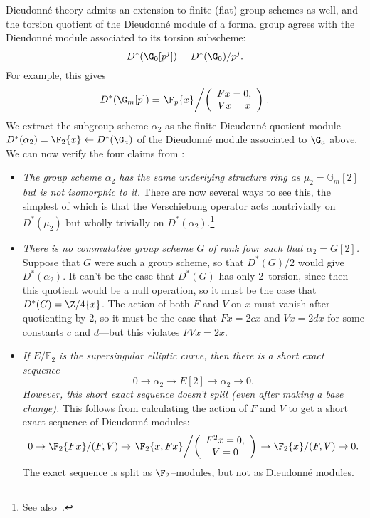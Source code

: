\begin{example}\label{WorkedAlpha2Example}
Dieudonn\'e theory admits an extension to finite (flat) group schemes as well, and the torsion quotient of the Dieudonn\'e module of a formal group agrees with the Dieudonn\'e module associated to its torsion subscheme: \[D^*(\G_0[p^j]) = D^*(\G_0) / p^j.\]  For example, this gives \[D^*(\G_m[p]) = \left.\F_p\{x\} \middle/\left(\begin{array}{c} Fx = 0, \\ Vx = x \end{array}\right)\right. .\]  We extract the subgroup scheme $\alpha_2$ as the finite Dieudonn\'e quotient module $D^*(\alpha_2) = \F_2\{x\} \leftarrow D^*(\G_a)$ of the Dieudonn\'e module associated to $\G_a$ above.  We can now verify the four claims from :
\begin{itemize}
\item \textit{The group scheme $\alpha_2$ has the same underlying structure ring as $\mu_2 = \mathbb{G}_m[2]$ but is not isomorphic to it.}  There are now several ways to see this, the simplest of which is that the Verschiebung operator acts nontrivially on $D^*(\mu_2)$ but wholly trivially on $D^*(\alpha_2)$.\footnote{See also~\cite[Example 8.5]{StricklandFPFP}.}
\item \textit{There is no commutative group scheme $G$ of rank four such that $\alpha_2 = G[2]$.}  Suppose that $G$ were such a group scheme, so that $D^*(G) / 2$ would give $D^*(\alpha_2)$.  It can't be the case that $D^*(G)$ has only $2$--torsion, since then this quotient would be a null operation, so it must be the case that $D^*(G) = \Z/4\{x\}$.  The action of both $F$ and $V$ on $x$ must vanish after quotienting by $2$, so it must be the case that $Fx = 2cx$ and $Vx = 2dx$ for some constants $c$ and $d$---but this violates $FVx = 2x$.
\item \textit{If $E/\mathbb{F}_2$ is the supersingular elliptic curve, then there is a short exact sequence \[0 \rightarrow \alpha_2 \rightarrow E[2] \rightarrow \alpha_2 \rightarrow 0.\]  However, this short exact sequence doesn't split (even after making a base change).}  This follows from calculating the action of $F$ and $V$ to get a short exact sequence of Dieudonn\'e modules: \[0 \to \F_2\{Fx\}/(F, V) \to \left.\F_2\{x, Fx\} \middle/ \left( \begin{array}{c} F^2x = 0, \\ V = 0 \end{array}\right) \right. \to \F_2\{x\}/(F, V) \to 0.\]  The exact sequence is split as $\F_2$--modules, but not as Dieudonn\'e modules.

\end{itemize}
\end{example}

